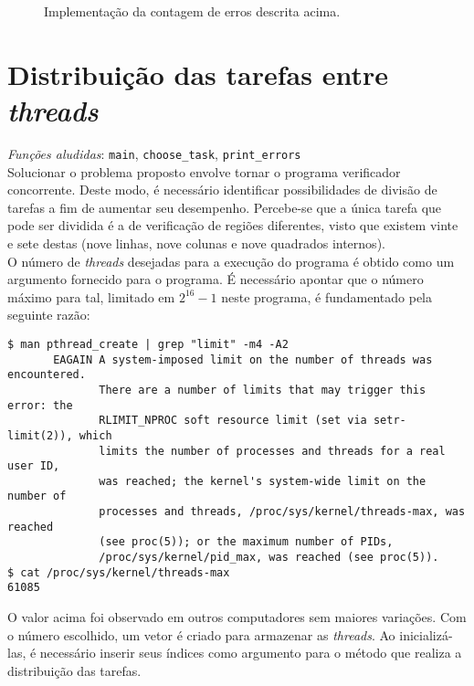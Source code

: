 \documentclass[12pt]{sftex/sftex}
\begin{document}
\begin{figure}[htbp]
  
  \caption{Implementação da contagem de erros descrita acima.}
\end{figure}

\section{Distribuição das tarefas entre \emph{threads}}

\emph{Funções aludidas}: \texttt{main}, \texttt{choose\_task},
\texttt{print\_errors} \\

Solucionar o problema proposto envolve tornar o programa verificador
concorrente. Deste modo, é necessário identificar possibilidades de divisão de
tarefas a fim de aumentar seu desempenho. Percebe-se que a única tarefa que
pode ser dividida é a de verificação de regiões diferentes, visto que existem
vinte e sete destas (nove linhas, nove colunas e nove quadrados internos). \\

O número de \emph{threads} desejadas para a execução do programa é obtido como
um argumento fornecido para o programa. É necessário apontar que o número
máximo para tal, limitado em $2^{16} - 1$ neste programa, é fundamentado pela
seguinte razão:

\begin{verbatim}
$ man pthread_create | grep "limit" -m4 -A2
       EAGAIN A system-imposed limit on the number of threads was encountered.
              There are a number of limits that may trigger this error: the
              RLIMIT_NPROC soft resource limit (set via setr‐limit(2)), which
              limits the number of processes and threads for a real user ID,
              was reached; the kernel's system-wide limit on the number of
              processes and threads, /proc/sys/kernel/threads-max, was reached
              (see proc(5)); or the maximum number of PIDs,
              /proc/sys/kernel/pid_max, was reached (see proc(5)).
$ cat /proc/sys/kernel/threads-max
61085
\end{verbatim}

O valor acima foi observado em outros computadores sem maiores variações. Com
o número escolhido, um vetor é criado para armazenar as \emph{threads}. Ao
inicializá-las, é necessário inserir seus índices como argumento para o método
que realiza a distribuição das tarefas. \\
\end{document}
